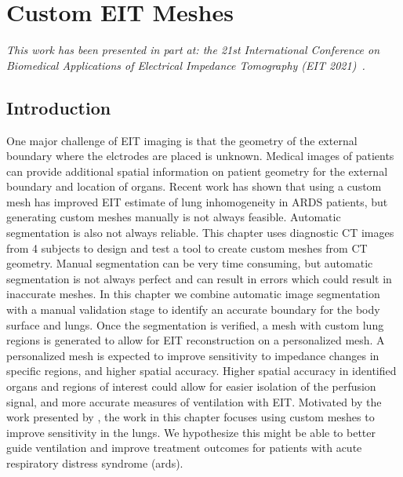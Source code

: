 \chapter{Custom EIT Meshes}
\label{chap:chapter-5}

\emph{This work has been presented in part at: 
 the 21st International Conference on Biomedical 
 Applications of Electrical Impedance Tomography (EIT 2021)~\parencite{stowe_generating_2021}.} 


\section{Introduction}
One major challenge of EIT imaging is that the geometry of the 
external boundary where the elctrodes are placed is unknown. 
Medical images of patients can provide additional spatial information 
on patient geometry for the external boundary and location of organs. 
Recent work has shown that using a custom mesh has improved 
EIT estimate of lung inhomogeneity \parencite{yang_lung_2021} in 
ARDS patients, but generating custom meshes manually is not always feasible. 
Automatic segmentation is also not always reliable. 
This chapter uses diagnostic CT images from 4 subjects to design and test 
a tool to create custom meshes from CT geometry. 
Manual segmentation can be very time consuming, but automatic segmentation is 
not always perfect and can result in errors which could result in inaccurate meshes. 
In this chapter we combine automatic image segmentation with a manual validation stage 
to identify an accurate boundary for the body surface and lungs. 
Once the segmentation is verified, a mesh with custom lung regions is generated to 
allow for EIT reconstruction on a personalized mesh. 
A personalized mesh is expected to improve sensitivity to impedance changes in specific
regions, and higher spatial accuracy. Higher spatial accuracy in 
identified organs and regions of interest could allow for 
easier isolation of the perfusion signal, and more accurate 
measures of ventilation with EIT.
Motivated by the work presented by ,
the work in this chapter focuses using custom meshes to improve sensitivity 
in the lungs.  We hypothesize this might be able to  
better guide ventilation and improve treatment outcomes 
for patients with acute respiratory distress syndrome (\acrshort{ards}).

